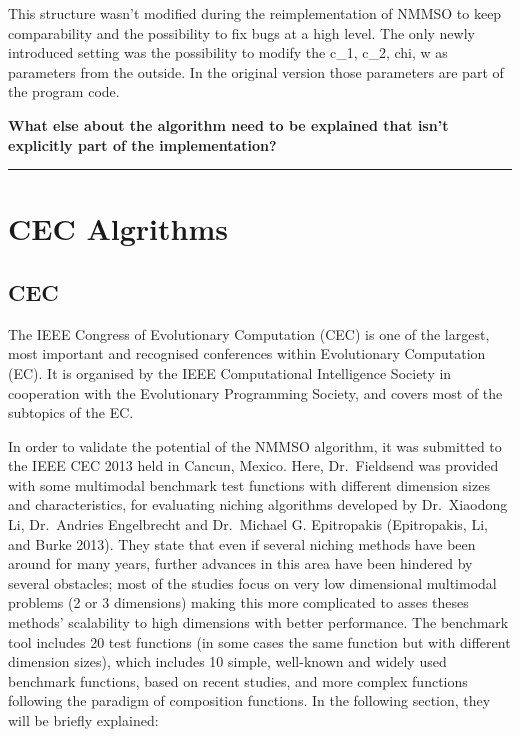 \documentclass[12pt,a4paper]{article}
\begin{document}
This structure wasn't modified during the reimplementation of NMMSO to
keep comparability and the possibility to fix bugs at a high level. The
only newly introduced setting was the possibility to modify the c\_1,
c\_2, chi, w as parameters from the outside. In the original version
those parameters are part of the program code.

\textbf{What else about the algorithm need to be explained that isn't
explicitly part of the implementation?}

\begin{center}\rule{0.5\linewidth}{\linethickness}\end{center}

\section{CEC Algrithms}\label{cec-algrithms}

\subsection{CEC}\label{cec}

The IEEE Congress of Evolutionary Computation (CEC) is one of the
largest, most important and recognised conferences within Evolutionary
Computation (EC). It is organised by the IEEE Computational Intelligence
Society in cooperation with the Evolutionary Programming Society, and
covers most of the subtopics of the EC.

In order to validate the potential of the NMMSO algorithm, it was
submitted to the IEEE CEC 2013 held in Cancun, Mexico. Here,
Dr.~Fieldsend was provided with some multimodal benchmark test functions
with different dimension sizes and characteristics, for evaluating
niching algorithms developed by Dr.~Xiaodong Li, Dr.~Andries Engelbrecht
and Dr.~Michael G. Epitropakis (Epitropakis, Li, and Burke 2013). They
state that even if several niching methods have been around for many
years, further advances in this area have been hindered by several
obstacles; most of the studies focus on very low dimensional multimodal
problems (2 or 3 dimensions) making this more complicated to asses
theses methods' scalability to high dimensions with better performance.
The benchmark tool includes 20 test functions (in some cases the same
function but with different dimension sizes), which includes 10 simple,
well-known and widely used benchmark functions, based on recent studies,
and more complex functions following the paradigm of composition
functions. In the following section, they will be briefly explained:
\end{document}
